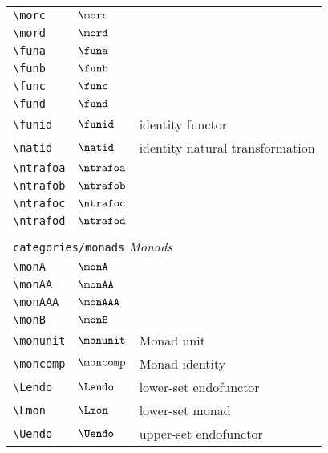\begin{longtable}{lll}
 {\color[rgb]{0.5,0.5,0.5}\texttt{\textbackslash morc}} & $\morc$ & \\ 
 {\color[rgb]{0.5,0.5,0.5}\texttt{\textbackslash mord}} & $\mord$ & \\ 
 {\color[rgb]{0.5,0.5,0.5}\texttt{\textbackslash funa}} & $\funa$ & \\ 
 {\color[rgb]{0.5,0.5,0.5}\texttt{\textbackslash funb}} & $\funb$ & \\ 
 {\color[rgb]{0.5,0.5,0.5}\texttt{\textbackslash func}} & $\func$ & \\ 
 {\color[rgb]{0.5,0.5,0.5}\texttt{\textbackslash fund}} & $\fund$ & \\ 
 {\color[rgb]{0.5,0.5,0.5}\texttt{\textbackslash funid}} & $\funid$ &  identity functor\\ 
 {\color[rgb]{0.5,0.5,0.5}\texttt{\textbackslash natid}} & $\natid$ &  identity natural transformation\\ 
 {\color[rgb]{0.5,0.5,0.5}\texttt{\textbackslash ntrafoa}} & $\ntrafoa$ & \\ 
 {\color[rgb]{0.5,0.5,0.5}\texttt{\textbackslash ntrafob}} & $\ntrafob$ & \\ 
 {\color[rgb]{0.5,0.5,0.5}\texttt{\textbackslash ntrafoc}} & $\ntrafoc$ & \\ 
 {\color[rgb]{0.5,0.5,0.5}\texttt{\textbackslash ntrafod}} & $\ntrafod$ & \\ 
  &  & \\ 
 \multicolumn{3}{l}{{\color[rgb]{0.5,0.5,0.5}\texttt{categories/monads}} \emph{Monads}}\\ 
 \hline
{\color[rgb]{0.5,0.5,0.5}\texttt{\textbackslash monA}} & $\monA$ & \\ 
 {\color[rgb]{0.5,0.5,0.5}\texttt{\textbackslash monAA}} & $\monAA$ & \\ 
 {\color[rgb]{0.5,0.5,0.5}\texttt{\textbackslash monAAA}} & $\monAAA$ & \\ 
 {\color[rgb]{0.5,0.5,0.5}\texttt{\textbackslash monB}} & $\monB$ & \\ 
 {\color[rgb]{0.5,0.5,0.5}\texttt{\textbackslash monunit}} & $\monunit$ &  Monad unit\\ 
 {\color[rgb]{0.5,0.5,0.5}\texttt{\textbackslash moncomp}} & $\moncomp$ &  Monad identity\\ 
 {\color[rgb]{0.5,0.5,0.5}\texttt{\textbackslash Lendo}} & $\Lendo$ &  lower-set endofunctor\\ 
 {\color[rgb]{0.5,0.5,0.5}\texttt{\textbackslash Lmon}} & $\Lmon$ &  lower-set monad\\ 
 {\color[rgb]{0.5,0.5,0.5}\texttt{\textbackslash Uendo}} & $\Uendo$ &  upper-set endofunctor\\ 

\end{longtable}
